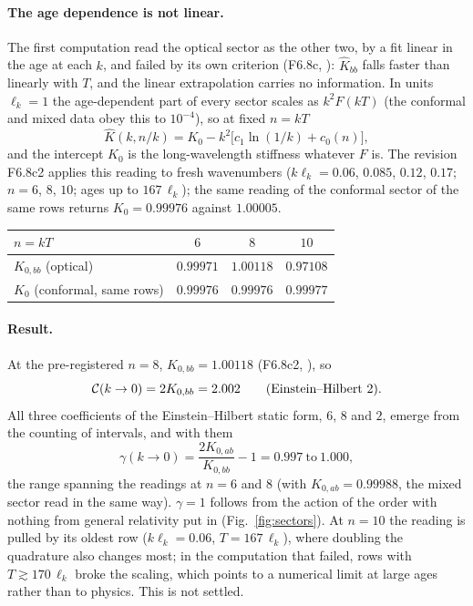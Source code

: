 \paragraph{The age dependence is not linear.} The first computation read the optical sector as the other two,
by a fit linear in the age at each $k$, and failed by its own criterion (F6.8c, ): $\hat K_{bb}$
falls faster than linearly with $T$, and the linear extrapolation carries no information. In units
$\ell_k=1$ the age-dependent part of every sector scales as $k^2F(kT)$ (the conformal and mixed data obey this to
$10^{-4}$), so at fixed $n=kT$
\begin{equation}
  \hat K(k,n/k)=K_0-k^2\big[c_1\ln(1/k)+c_0(n)\big],
\end{equation}
and the intercept $K_0$ is the long-wavelength stiffness whatever $F$ is. The revision F6.8c2 applies this
reading to fresh wavenumbers ($k\ell_k=0.06$, $0.085$, $0.12$, $0.17$; $n=6$, $8$, $10$; ages up to $167\,\ell_k$);
the same reading of the conformal sector of the same rows returns $K_0=0.99976$ against $1.00005$.

\begin{center}
\begin{tabular}{lccc}
\toprule
$n=kT$ & $6$ & $8$ & $10$\\
\midrule
$K_{0,bb}$ (optical) & $0.99971$ & $1.00118$ & $0.97108$\\
$K_0$ (conformal, same rows) & $0.99976$ & $0.99976$ & $0.99977$\\
\bottomrule
\end{tabular}
\end{center}

\paragraph{Result.} At the pre-registered $n=8$, $K_{0,bb}=1.00118$ (F6.8c2, ), so
\begin{equation}
  \mathcal{C}(k\to0)=2K_{0,bb}=2.002\qquad(\text{Einstein--Hilbert }2).
\end{equation}
All three coefficients of the Einstein--Hilbert static form, $6$, $8$ and $2$, emerge from the counting of
intervals, and with them
\begin{equation}
  \gamma(k\to0)=\frac{2K_{0,ab}}{K_{0,bb}}-1=0.997\ \text{to}\ 1.000 ,
\end{equation}
the range spanning the readings at $n=6$ and $8$ (with $K_{0,ab}=0.99988$, the mixed sector read in the same way). $\gamma=1$ follows from the action of the order with nothing
from general relativity put in (Fig.~\ref{fig:sectors}). At $n=10$ the reading is pulled by its oldest row ($k\ell_k=0.06$,
$T=167\,\ell_k$), where doubling the quadrature also changes most; in the computation that failed, rows with
$T\gtrsim170\,\ell_k$ broke the scaling, which points to a numerical limit at large ages rather than to physics.
This is not settled.

